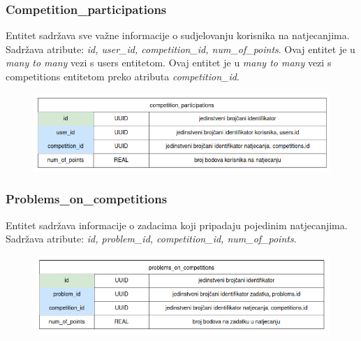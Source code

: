 				\vspace{30mm}

				\subsubsection*{Competition\_participations}

				Entitet  sadržava sve važne informacije o sudjelovanju korisnika na natjecanjima. Sadržava atribute: \textit{id, user\_id, competition\_id, num\_of\_points}. Ovaj entitet je u \textit{many to many} vezi s users entitetom. Ovaj entitet je u \textit{many to many} vezi s competitions entitetom preko atributa \textit{competition\_id}.

				\vspace{20mm}

				\begin{figure}[htbp]
					\centering
					\includegraphics[width=\linewidth]{slike/competition_participations_tablica.png}
				\end{figure}

				\vspace{30mm}

				\subsubsection*{Problems\_on\_competitions}

				Entitet  sadržava informacije o zadacima koji pripadaju pojedinim natjecanjima. Sadržava atribute: \textit{id, problem\_id, competition\_id, num\_of\_points}.

				\vspace{20mm}

				\begin{figure}[htbp]
					\centering
					\includegraphics[width=\linewidth]{slike/problems_on_competitions_tablica.png}
				\end{figure}


